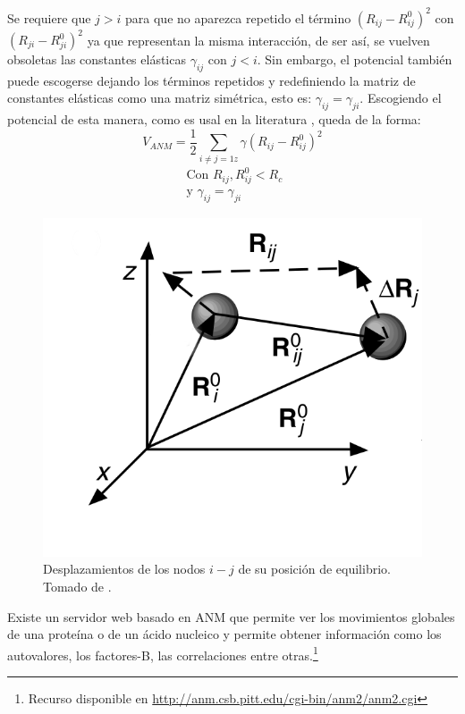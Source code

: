 Se requiere que $j>i$ para que no aparezca repetido el t\'{e}rmino $\left(R_{ij}-R_{ij}^0\right)^2$ con $\left(R_{ji}-R_{ji}^0\right)^2$   ya que representan la misma interacci\'{o}n, de ser as\'{i}, se vuelven obsoletas las constantes el\'{a}sticas $\gamma_{ij}$ con $j<i$. Sin embargo, el potencial tambi\'{e}n puede escogerse dejando los t\'{e}rminos repetidos y redefiniendo la matriz de constantes el\'{a}sticas como una matriz sim\'{e}trica, esto es: $\gamma_{ij}=\gamma_{ji}$. Escogiendo el potencial de esta manera, como es usal en la literatura \cite{Rader2006}, queda de la forma:
\begin{equation}\label{eq:26}
V_{ANM}=
   \frac{1}{2}\sum_{
   i\neq j=1  z
   }
   \gamma\left(R_{ij}-R_{ij}^0\right)^2
\end{equation}
\begin{eqnarray*}
\mbox{			Con		} R_{ij},R_{ij}^0<R_c \\
\mbox{			y		} \gamma_{ij}=\gamma_{ji}
\end{eqnarray*}
\begin{figure}
\centering%
\includegraphics[scale=0.3]{Kap2/resorte.png}%
\caption{Desplazamientos de los nodos $i-j$ de su posici\'{o}n de equilibrio. Tomado de \cite{Rader2006}.} \label{fig:res}
\end{figure}
Existe un servidor web \cite{Eyal2015} basado en ANM que permite ver los movimientos globales de una prote\'{i}na o de un \'{a}cido nucleico y permite obtener informaci\'{o}n como los autovalores, los factores-B, las correlaciones entre otras.\footnote{ Recurso disponible en \url{http://anm.csb.pitt.edu/cgi-bin/anm2/anm2.cgi}}
